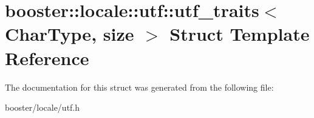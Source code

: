 \section{booster\-:\-:locale\-:\-:utf\-:\-:utf\-\_\-traits$<$ Char\-Type, size $>$ Struct Template Reference}
\label{structbooster_1_1locale_1_1utf_1_1utf__traits}


The documentation for this struct was generated from the following file\-:\begin{DoxyCompactItemize}
\item 
booster/locale/utf.\-h\end{DoxyCompactItemize}
